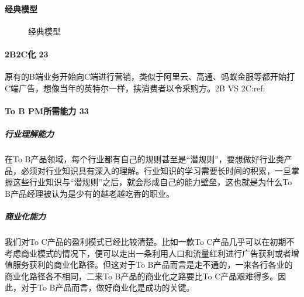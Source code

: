 \documentclass[letterpaper,10pt,english]{sphinxmanual}
\begin{document}
\paragraph{经典模型}
\label{\detokenize{chapter_introduction/2B:id32}}
\begin{figure}[H]
\centering
\capstart

\noindent{}
\caption{经典模型\sphinxfootnotemark[89]}\label{\detokenize{chapter_introduction/2B:id43}}\end{figure}
%
\begin{footnotetext}[89]\sphinxAtStartFootnote
{}
%
\end{footnotetext}\ignorespaces 

\paragraph{2B2C化 23\sphinxfootnotemark[90]}
\label{\detokenize{chapter_introduction/2B:b2c-23}}%
\begin{footnotetext}[90]\sphinxAtStartFootnote
{}
%
\end{footnotetext}\ignorespaces 
原有的B端业务开始向C端进行营销，类似于阿里云、高通、蚂蚁金服等都开始打C端广告，想像当年的英特尔一样，挟消费者以令采购方。2B
VS 2C:ref:


\paragraph{To B PM所需能力 33\sphinxfootnotemark[91]}
\label{\detokenize{chapter_introduction/2B:to-b-pm-33}}%
\begin{footnotetext}[91]\sphinxAtStartFootnote
{}
%
\end{footnotetext}\ignorespaces 

\subparagraph{行业理解能力}
\label{\detokenize{chapter_introduction/2B:id33}}
在To
B产品领域，每个行业都有自己的规则甚至是“潜规则”，要想做好行业类产品，必须对行业知识具有深入的理解。行业知识的学习需要长时间的积累，一旦掌握这些行业知识与“潜规则”之后，就会形成自己的能力壁垒，这也就是为什么To
B产品经理被认为是少有的越老越吃香的职业。


\subparagraph{商业化能力}
\label{\detokenize{chapter_introduction/2B:id34}}
我们对To C产品的盈利模式已经比较清楚。比如一款To
C产品几乎可以在初期不考虑商业模式的情况下，便可以走出一条利用人口和流量红利进行广告获利或者增值服务获利的商业化路径。但这对于To
B产品而言是走不通的，一来各行各业的商业化路径各不相同，二来To
B产品的商业化之路要比To C产品艰难得多。因此，对于To
B产品而言，做好商业化是成功的关键。
\end{document}

